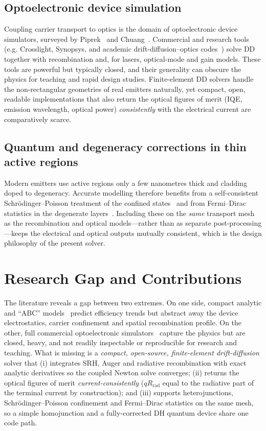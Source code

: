 \documentclass[conference]{IEEEtran}
\begin{document}
\subsection{Optoelectronic device simulation}
Coupling carrier transport to optics is the domain of optoelectronic device
simulators, surveyed by Piprek~\cite{piprek_book} and Chuang~\cite{chuang}.
Commercial and research tools (e.g. Crosslight, Synopsys, and academic
drift-diffusion--optics codes~\cite{bulashevich,grupen}) solve DD together with
recombination and, for lasers, optical-mode and gain models. These tools are
powerful but typically closed, and their generality can obscure the physics for
teaching and rapid design studies. Finite-element DD solvers handle the
non-rectangular geometries of real emitters naturally, yet compact, open,
readable implementations that also return the optical figures of merit
(IQE, emission wavelength, optical power) \emph{consistently} with the electrical
current are comparatively scarce.

\subsection{Quantum and degeneracy corrections in thin active regions}
Modern emitters use active regions only a few nanometres thick and cladding doped
to degeneracy. Accurate modelling therefore benefits from a self-consistent
Schr\"odinger--Poisson treatment of the confined states~\cite{trellakis} and from
Fermi--Dirac statistics in the degenerate layers~\cite{sze}. Including these on the
\emph{same} transport mesh as the recombination and optical models---rather than as
separate post-processing---keeps the electrical and optical outputs mutually
consistent, which is the design philosophy of the present solver.

\section{Research Gap and Contributions}
\label{sec:gap}
The literature reveals a gap between two extremes. On one side, compact analytic
and ``ABC'' models~\cite{karpov} predict efficiency trends but abstract away the
device electrostatics, carrier confinement and spatial recombination profile. On
the other, full commercial optoelectronic simulators~\cite{piprek_book} capture
the physics but are closed, heavy, and not readily inspectable or reproducible for
research and teaching. What is missing is a \emph{compact, open-source,
finite-element drift-diffusion} solver that (i) integrates SRH, Auger and
radiative recombination with exact analytic derivatives so the coupled Newton
solve converges; (ii) returns the optical figures of merit \emph{current-consistently}
($qR_{\mathrm{rad}}$ equal to the radiative part of the terminal current by
construction); and (iii) supports heterojunctions, Schr\"odinger--Poisson
confinement and Fermi--Dirac statistics on the same mesh, so a simple homojunction
and a fully-corrected DH quantum device share one code path.
\end{document}
